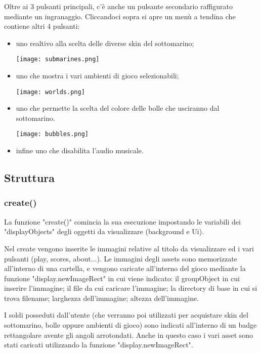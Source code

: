 \documentclass[12pt]{article}
\begin{document}
Oltre ai 3 pulsanti principali, c'è anche un pulsante secondario raffigurato mediante un ingranaggio. Cliccandoci sopra si apre un menù a tendina che contiene altri 4 pulsanti:
\begin{itemize}
    \item uno realtivo alla scelta delle diverse skin del sottomarino; 
\begin{center}
    \texttt{[image: submarines.png]}\\
\end{center}
    \item uno che mostra i vari ambienti di gioco selezionabili; 

\begin{center}
    \texttt{[image: worlds.png]}\\
\end{center}


    \item uno che permette la scelta del colore delle bolle che usciranno dal sottomarino. 
\\
\begin{center}
    \texttt{[image: bubbles.png]}\\
\end{center}

    \item infine uno che disabilita l'audio musicale. 
\end{itemize}

\subsection{Struttura}
\subsubsection{create()}
La funzione "create()" comincia la sua esecuzione impostando le variabili dei "displayObjects" degli oggetti da visualizzare (background e Ui). 

Nel create vengono inserite le immagini relative al titolo da visualizzare ed i vari pulsanti (play, scores, about...). Le immagini degli assets sono memorizzate all'interno di una cartella, e vengono caricate all'interno del gioco mediante la funzione "display.newImageRect" in cui viene indicato: il groupObject in cui inserire l'immagine; il file da cui caricare l'immagine; la directory di base in cui si trova filename; larghezza dell'immagine; altezza dell'immagine. 

I soldi posseduti dall'utente (che verranno poi utilizzati per acquistare skin del sottomarino, bolle oppure ambienti di gioco) sono indicati all'interno di un badge rettangolare avente gli angoli arrotondati. Anche in questo caso i vari asset sono stati caricati utilizzando la funzione "display.newImageRect". 
\end{document}
